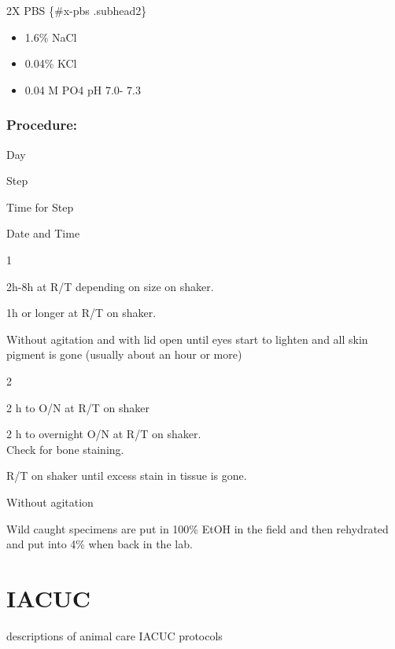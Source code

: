 \documentclass[
]{book}
\providecommand{\tightlist}{%
  \setlength{\itemsep}{0pt}\setlength{\parskip}{0pt}}
\begin{document}
2X PBS \{\#x-pbs .subhead2\}

\begin{itemize}
\tightlist
\item
  1.6\% NaCl
\item
  0.04\% KCl
\item
  0.04 M PO4 pH 7.0- 7.3
\end{itemize}

\hypertarget{procedure-5}{%
\subsection{Procedure:}\label{procedure-5}}

Day

Step

Time for Step

Date and Time

1

2h-8h at R/T depending on size on shaker.

1h or longer at R/T on shaker.

Without agitation and with lid open until eyes start to lighten and all
skin pigment is gone (usually about an hour or more)

2

2 h to O/N at R/T on shaker

2 h to overnight O/N at R/T on shaker.\\
Check for bone staining.

R/T on shaker until excess stain in tissue is gone.

Without agitation

Wild caught specimens are put in 100\% EtOH in the field and then
rehydrated and put into 4\% when back in the lab.

\hypertarget{iacuc}{%
\chapter{IACUC}\label{iacuc}}

descriptions of animal care IACUC protocols

  
\end{document}
